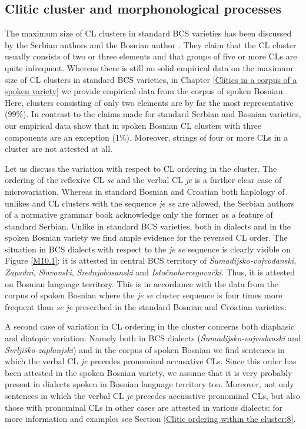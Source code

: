 \subsection{Clitic cluster and morphonological processes}
\label{sec:10.2.2}
The maximum size of CL clusters in standard BCS varieties has been discussed by the Serbian authors \citet[451f]{PiperKlajn14} and the Bosnian author \citet[558]{Ridjanovic12}. They claim that the CL cluster usually consists of two or three elements and that groups of five or more CLs are quite infrequent. Whereas there is still no solid empirical data on the maximum size of CL clusters in standard BCS varieties, in Chapter \ref{Clitics in a corpus of a spoken variety} we provide empirical data from the corpus of spoken Bosnian. Here, clusters consisting of only two elements are by far the most representative (99\%). In contrast to the claims made for standard Serbian and Bosnian varieties, our empirical data show that in spoken Bosnian CL clusters with three components are an exception (1\%). Moreover, strings of four or more CLs in a cluster are not attested at all. 

Let us discuss the variation with respect to CL ordering in the cluster. The ordering of the reflexive CL \textit{se} and the verbal CL \textit{je} is a further clear case of microvariation. Whereas in standard Bosnian and Croatian both haplology of unlikes and CL clusters with the sequence \textit{je} \textit{se} are allowed, the Serbian authors of a normative grammar book \citet[452]{PiperKlajn14} acknowledge only the former as a feature of standard Serbian. Unlike in standard BCS varieties, both in dialects and in the spoken Bosnian variety we find ample evidence for the reversed CL order. The situation in BCS dialects with respect to the \textit{je} \textit{se} sequence is clearly visible on Figure \ref{M10.1}: it is attested in central BCS territory of \textit{Šumadijsko-vojvođanski}, \textit{Zapadni}, \textit{Slavonski}, \textit{Srednjobosanski} and \textit{Istočnohercegovački}. Thus, it is attested on Bosnian language territory. This is in accordance with the data from the corpus of spoken Bosnian where the \textit{je} \textit{se} cluster sequence is four times more frequent than \textit{se} \textit{je} prescribed in the standard Bosnian and Croatian varieties.  

A second case of variation in CL ordering in the cluster concerns both diaphasic and diatopic variation. Namely both in BCS dialects (\textit{Šumadijsko-vojvođanski} and \textit{Svrljiško-zaplanjski}) and in the corpus of spoken Bosnian we find sentences in which the verbal CL \textit{je} precedes pronominal accusative CLs. Since this order has been attested in the spoken Bosnian variety, we assume that it is very probably present in dialects spoken in Bosnian language territory too. Moreover, not only sentences in which the verbal CL \textit{je} precedes accusative pronominal CLs, but also those with pronominal CLs in other cases are attested in various dialects: for more information and examples see Section \ref{Clitic ordering within the cluster:8}.

